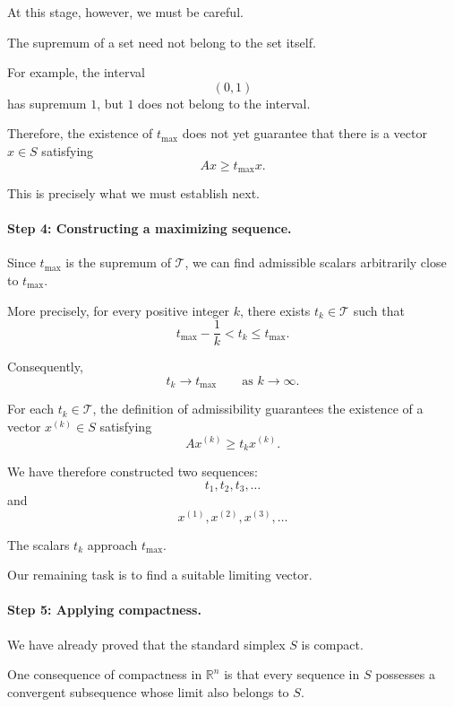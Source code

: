 \documentclass[11pt,a4paper]{article}
\theoremstyle{definition}
\theoremstyle{remark}
\begin{document}
At this stage, however,
we must be careful.

The supremum of a set
need not belong to the set itself.

For example, the interval
\[
(0,1)
\]
has supremum $1$,
but $1$ does not belong
to the interval.

Therefore, the existence
of $t_{\max}$ does not yet
guarantee that there is
a vector $x\in S$ satisfying
\[
Ax\geq t_{\max}x.
\]

This is precisely what
we must establish next.


\paragraph{Step 4: Constructing a maximizing sequence.}

Since $t_{\max}$ is the supremum
of $\mathcal{T}$, we can find
admissible scalars arbitrarily
close to $t_{\max}$.

More precisely, for every
positive integer $k$,
there exists $t_k\in\mathcal{T}$
such that
\[
t_{\max}-\frac{1}{k}
<
t_k
\leq t_{\max}.
\]

Consequently,
\begin{equation}
t_k\longrightarrow t_{\max}
\qquad\text{as }k\to\infty.
\end{equation}

For each $t_k\in\mathcal{T}$,
the definition of admissibility
guarantees the existence of
a vector $x^{(k)}\in S$
satisfying
\begin{equation}
Ax^{(k)}\geq t_kx^{(k)}.
\label{eq:perron_maximizing_sequence}
\end{equation}

We have therefore constructed
two sequences:
\[
t_1,t_2,t_3,\ldots
\]
and
\[
x^{(1)},x^{(2)},x^{(3)},\ldots
\]

The scalars $t_k$ approach
$t_{\max}$.

Our remaining task is to find
a suitable limiting vector.


\paragraph{Step 5: Applying compactness.}

We have already proved that  the standard simplex
$S$ is compact.

One consequence of compactness
in $\mathbb{R}^n$ is that
every sequence in $S$ possesses
a convergent subsequence
whose limit also belongs to $S$.
\end{document}
